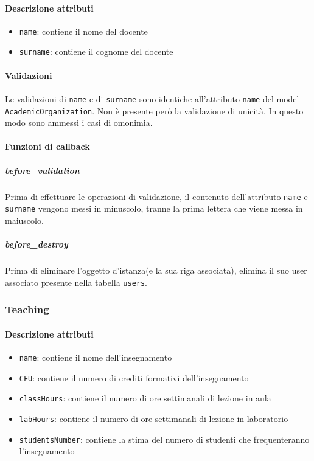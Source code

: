 \documentclass[11pt,a4paper]{article}
\begin{document}
\paragraph{Descrizione attributi}
\begin{itemize}
 \item \verb|name|: contiene il nome del docente
 \item \verb|surname|: contiene il cognome del docente
\end{itemize}
\paragraph{Validazioni}
Le validazioni di \verb|name| e di \verb|surname| sono identiche all'attributo \verb|name| del model \verb|AcademicOrganization|. Non è presente però la validazione di unicità. In questo modo sono ammessi i casi di omonimia.
\paragraph{Funzioni di callback}
\subparagraph{before\_validation}
Prima di effettuare le operazioni di validazione, il contenuto dell'attributo \verb|name| e \verb|surname| vengono messi in minuscolo, tranne la prima lettera che viene messa in maiuscolo.
\subparagraph{before\_destroy}
Prima di eliminare l'oggetto d'istanza(e la sua riga associata), elimina il suo user associato presente nella tabella \verb|users|.
\subsubsection{Teaching}
\paragraph{Descrizione attributi}
\begin{itemize}
 \item \verb|name|: contiene il nome dell'insegnamento
 \item \verb|CFU|: contiene il numero di crediti formativi dell'insegnamento
 \item \verb|classHours|: contiene il numero di ore settimanali di lezione in aula
 \item \verb|labHours|: contiene il numero di ore settimanali di lezione in laboratorio
 \item \verb|studentsNumber|: contiene la stima del numero di studenti che frequenteranno l'insegnamento 
\end{itemize}
\end{document}
